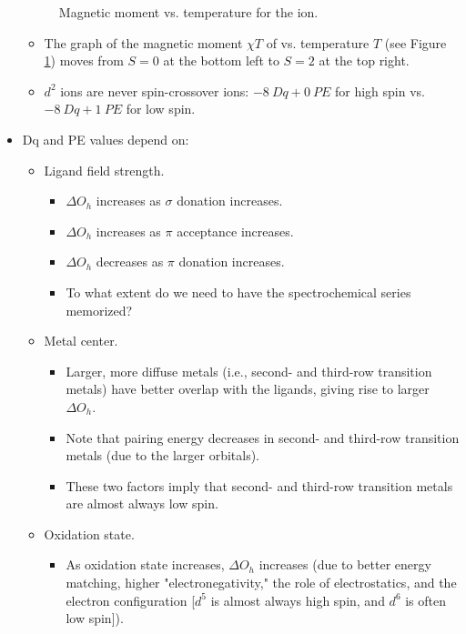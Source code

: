 \documentclass[../notes.tex]{subfiles}
\begin{document}
\begin{itemize}
\begin{figure}[h!]
\begin{tikzpicture}[
            every node/.style={black}
        ]
        \end{tikzpicture}
        \caption{Magnetic moment vs. temperature for the  ion.}
        \label{fig:FeIIspin-crossover}
    \end{figure}
    \begin{itemize}
        \item The graph of the magnetic moment $\chi T$ of  vs. temperature $T$ (see Figure \ref{fig:FeIIspin-crossover}) moves from $S=0$ at the bottom left to $S=2$ at the top right.
        \item $d^2$ ions are never spin-crossover ions: $\SI{-8}{Dq}+\SI{0}{PE}$ for high spin vs. $\SI{-8}{Dq}+\SI{1}{PE}$ for low spin.
    \end{itemize}
    \item Dq and PE values depend on:
    \begin{itemize}
        \item Ligand field strength.
        \begin{itemize}
            \item $\Delta O_h$ increases as $\sigma$ donation increases.
            \item $\Delta O_h$ increases as $\pi$ acceptance increases.
            \item $\Delta O_h$ decreases as $\pi$ donation increases.
            \item To what extent do we need to have the spectrochemical series memorized?
        \end{itemize}
        \item Metal center.
        \begin{itemize}
            \item Larger, more diffuse metals (i.e., second- and third-row transition metals) have better overlap with the ligands, giving rise to larger $\Delta O_h$.
            \item Note that pairing energy decreases in second- and third-row transition metals (due to the larger orbitals).
            \item These two factors imply that second- and third-row transition metals are almost always low spin.
        \end{itemize}
        \item Oxidation state.
        \begin{itemize}
            \item As oxidation state increases, $\Delta O_h$ increases (due to better energy matching, higher "electronegativity," the role of electrostatics, and the electron configuration [$d^5$ is almost always high spin, and $d^6$ is often low spin]).

\end{itemize}
\end{itemize}
\end{itemize}
\end{document}
